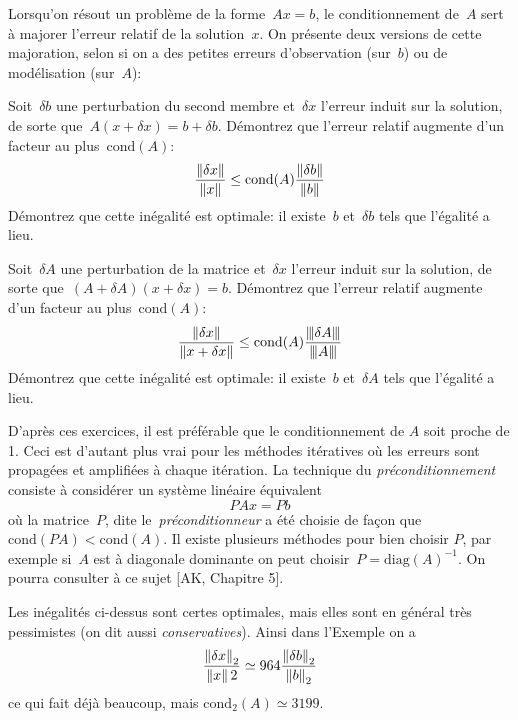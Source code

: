 Lorsqu'on résout un problème de la forme~$Ax=b$, le conditionnement de~$A$
sert à majorer l'erreur relatif de la solution~$x$.  On présente deux
versions de cette majoration, selon si on a des petites erreurs d'observation
(sur~$b$) ou de modélisation (sur~$A$):

\begin{exercice}
	Soit~$\delta b$ une perturbation du second membre et~$\delta x$ l'erreur
	induit sur la solution, de sorte que~$A(x+\delta x)=b+\delta b$.  Démontrez
	que l'erreur relatif augmente d'un facteur au plus~$\mathrm{cond}(A)$:
	\[
		\frac{\left\|\delta x\right\|}{\left\|x\right\|}
		\le
		\mathrm{cond}(A)
		\frac{\left\|\delta b\right\|}{\left\|b\right\|}
	\]
	Démontrez que cette inégalité est optimale: il existe~$b$ et~$\delta
	b$ tels que l'égalité a lieu.
\end{exercice}


\begin{exercice}
	Soit~$\delta A$ une perturbation de la matrice et~$\delta x$ l'erreur
	induit sur la solution, de sorte que~$(A+\delta A)(x+\delta x)=b$.  Démontrez
	que l'erreur relatif augmente d'un facteur au plus~$\mathrm{cond}(A)$:
	\[
		\frac{\left\|\delta x\right\|}{\left\|x+\delta x\right\|}
		\le
		\mathrm{cond}(A)
		\frac{{\left\vert\kern-0.25ex\left\vert\kern-0.25ex\left\vert \delta A \right\vert\kern-0.25ex\right\vert\kern-0.25ex\right\vert}}{{\left\vert\kern-0.25ex\left\vert\kern-0.25ex\left\vert A \right\vert\kern-0.25ex\right\vert\kern-0.25ex\right\vert}}
	\]
	Démontrez que cette inégalité est optimale: il existe~$b$ et~$\delta
	A$ tels que l'égalité a lieu.
\end{exercice}

\begin{remark}
	D'après ces exercices, il est préférable que le conditionnement de $A$ soit
	proche de 1. Ceci est d'autant plus vrai pour les méthodes itératives où
	les erreurs sont propagées et amplifiées à chaque itération. La technique
	du \emph{préconditionnement} consiste à considérer un système linéaire
	équivalent
	\[
		PAx = Pb
	\]
	où la matrice~$P$, dite le~\emph{préconditionneur} a été choisie de façon
	que $\mathrm{cond} (PA) < \mathrm{cond}(A)$. Il existe plusieurs méthodes
	pour bien choisir $P$, par exemple si~$A$ est à diagonale dominante on peut
	choisir~$P=\mathrm{diag}(A)^{-1}$.
	On pourra consulter à ce sujet [AK, Chapitre 5].
\end{remark}

\begin{remark}
\label{rm:cond}
Les inégalités ci-dessus sont certes optimales, mais elles sont en général
très pessimistes (on dit aussi \emph{conservatives}). Ainsi dans
l'Exemple on a
\[
\frac{\left\|\delta x\right\|_{2}}{\left\|x\right\|{2}} \simeq 964 \frac{\left\|\delta
b\right\|_{2}}{\left\|b\right\|_{2}}
\]
ce qui fait déjà beaucoup, mais $\mathrm{cond}_2(A) \simeq 3199$.
\end{remark}

